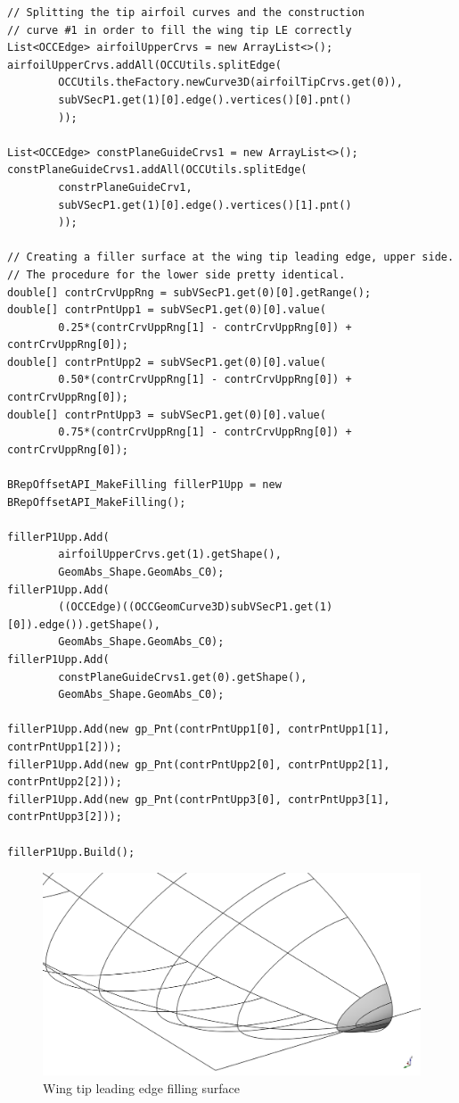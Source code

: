 \begin{lstlisting}[caption={Wing tip leading edge filling code, upper side}, captionpos=b, tabsize=2, label={lst:WingTipFilling}]
// Splitting the tip airfoil curves and the construction  
// curve #1 in order to fill the wing tip LE correctly
List<OCCEdge> airfoilUpperCrvs = new ArrayList<>();
airfoilUpperCrvs.addAll(OCCUtils.splitEdge(
		OCCUtils.theFactory.newCurve3D(airfoilTipCrvs.get(0)), 
		subVSecP1.get(1)[0].edge().vertices()[0].pnt()
		));
		
List<OCCEdge> constPlaneGuideCrvs1 = new ArrayList<>();
constPlaneGuideCrvs1.addAll(OCCUtils.splitEdge(
		constrPlaneGuideCrv1, 
		subVSecP1.get(1)[0].edge().vertices()[1].pnt()
		));

// Creating a filler surface at the wing tip leading edge, upper side.
// The procedure for the lower side pretty identical.			
double[] contrCrvUppRng = subVSecP1.get(0)[0].getRange();
double[] contrPntUpp1 = subVSecP1.get(0)[0].value(
		0.25*(contrCrvUppRng[1] - contrCrvUppRng[0]) + contrCrvUppRng[0]);
double[] contrPntUpp2 = subVSecP1.get(0)[0].value(
		0.50*(contrCrvUppRng[1] - contrCrvUppRng[0]) + contrCrvUppRng[0]);
double[] contrPntUpp3 = subVSecP1.get(0)[0].value(
		0.75*(contrCrvUppRng[1] - contrCrvUppRng[0]) + contrCrvUppRng[0]);

BRepOffsetAPI_MakeFilling fillerP1Upp = new BRepOffsetAPI_MakeFilling();

fillerP1Upp.Add(
		airfoilUpperCrvs.get(1).getShape(),
		GeomAbs_Shape.GeomAbs_C0);
fillerP1Upp.Add(
		((OCCEdge)((OCCGeomCurve3D)subVSecP1.get(1)[0]).edge()).getShape(),
		GeomAbs_Shape.GeomAbs_C0);
fillerP1Upp.Add(
		constPlaneGuideCrvs1.get(0).getShape(),
		GeomAbs_Shape.GeomAbs_C0);		

fillerP1Upp.Add(new gp_Pnt(contrPntUpp1[0], contrPntUpp1[1], contrPntUpp1[2]));
fillerP1Upp.Add(new gp_Pnt(contrPntUpp2[0], contrPntUpp2[1], contrPntUpp2[2]));
fillerP1Upp.Add(new gp_Pnt(contrPntUpp3[0], contrPntUpp3[1], contrPntUpp3[2]));

fillerP1Upp.Build();
\end{lstlisting}
% 
\bigskip
\begin{figure}[H]
\centering
\includegraphics[scale=0.35]{Immagini/Capitolo3/WingTipLEFilling}
\caption{Wing tip leading edge filling surface}
\label{fig:WingTipFilling}
\end{figure}
%  

